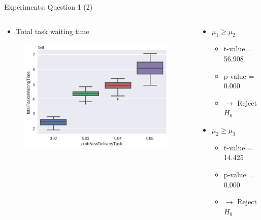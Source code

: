 \begin{frame}{Experiments: Question 1 (2)}
    \begin{columns}

        \begin{column}{0.5\textwidth}
            \begin{itemize}
                \item Total task waiting time
            \end{itemize}

            \begin{figure}[hbt]
                \includegraphics[width=1.1\textwidth]{img/question1-plot1}
            \end{figure}
        \end{column}

        \begin{column}{0.5\textwidth}
            \begin{itemize}
                \item $\mu_1 \geq \mu_2$
                    \begin{itemize}
                        \item t-value = 56.908
                        \item p-value = 0.000
                        \item $\rightarrow$ Reject $H_0$
                    \end{itemize}

                \item $\mu_2 \geq \mu_3$
                    \begin{itemize}
                        \item t-value = 14.425
                        \item p-value = 0.000
                        \item $\rightarrow$ Reject $H_0$
                    \end{itemize}


\end{itemize}
\end{column}
\end{columns}
\end{frame}

